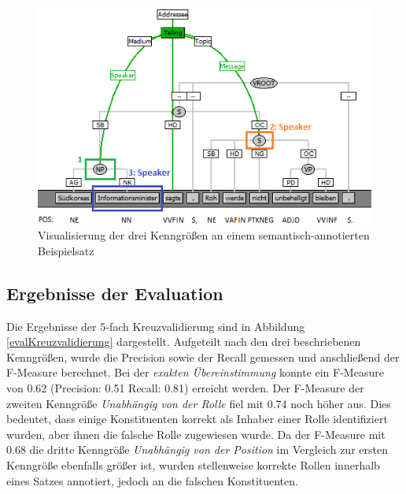 \documentclass[12pt]{article}
\begin{document}
		\begin{figure}[tb!]
			\centering
			\includegraphics{images/evaluation_kenngroeszen.png}
			\caption[Visualisierung der Kenngrößen]{Visualisierung der drei Kenngrößen an einem semantisch-annotierten Beispielsatz}
			\label{evalKenngroeszen}
		\end{figure}


\subsection{Ergebnisse der Evaluation}

Die Ergebnisse der 5-fach Kreuzvalidierung sind in Abbildung \ref{evalKreuzvalidierung} dargestellt. Aufgeteilt nach den drei beschriebenen Kenngrößen, wurde die Precision sowie der Recall gemessen und anschließend der F-Measure berechnet. Bei der \textit{exakten Übereinstimmung} konnte ein F-Measure von 0.62 (Precision: 0.51 Recall: 0.81) erreicht werden. Der F-Measure der zweiten Kenngröße \textit{Unabhängig von der Rolle} fiel mit 0.74 noch höher aus. Dies bedeutet, dass einige Konstituenten korrekt als Inhaber einer Rolle identifiziert wurden, aber ihnen die falsche Rolle zugewiesen wurde. Da der F-Measure mit 0.68 die dritte Kenngröße \textit{Unabhängig von der Position} im Vergleich zur ersten Kenngröße ebenfalls größer ist, wurden stellenweise korrekte Rollen innerhalb eines Satzes annotiert, jedoch an die falschen Konstituenten. 

\end{document}
